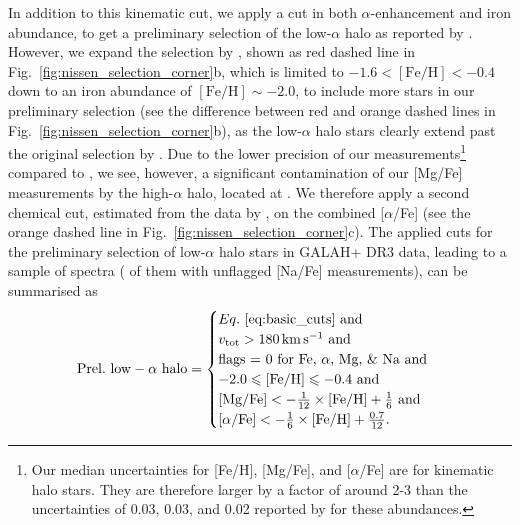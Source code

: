 \documentclass[fleqn,usenatbib]{mnras}
\begin{document}
In addition to this kinematic cut, we apply a cut in both $\alpha$-enhancement and iron abundance, to get a preliminary selection of the low-$\alpha$ halo as reported by \citet{Nissen2010}. However, we expand the selection by \citet{Nissen2010}, shown as red dashed line in Fig.~\ref{fig:nissen_selection_corner}b, which is limited to $-1.6 < \mathrm{[Fe/H]} < -0.4$ down to an iron abundance of $\mathrm{[Fe/H]} \sim -2.0$, to include more stars in our preliminary selection (see the difference between red and orange dashed lines in Fig.~\ref{fig:nissen_selection_corner}b), as the low-$\alpha$ halo stars clearly extend past the original selection by \citet{Nissen2010}. Due to the lower precision of our measurements\footnote{Our median uncertainties for [Fe/H], [Mg/Fe], and [$\alpha$/Fe] are \protect for kinematic halo stars. They are therefore larger by a factor of around 2-3 than the uncertainties of 0.03, 0.03, and 0.02 reported by \citet{Nissen2010} for these abundances.} compared to \citet{Nissen2010}, we see, however, a significant contamination of our [Mg/Fe] measurements by the high-$\alpha$ halo, located at . We therefore apply a second chemical cut, estimated from the data by \citet{Nissen2010}, on the combined [$\alpha$/Fe] (see the orange dashed line in Fig.~\ref{fig:nissen_selection_corner}c). The applied cuts for the preliminary selection of low-$\alpha$ halo stars in GALAH+ DR3 data, leading to a sample of  spectra ( of them with unflagged [Na/Fe] measurements), can be summarised as
\begin{equation} \label{eq:prelim_low_alpha_halo}
\mathrm{Prel.~low-\alpha~halo} =
\begin{cases}
Eq.~\ref{eq:basic_cuts} \text{ and} \\
v_\text{tot} > 180\,\mathrm{km\,s^{-1}} \text{ and} \\
\text{flags = 0 for Fe, }\alpha\text{, Mg, \& Na and} \\
-2.0 \leq \mathrm{[Fe/H]} \leq -0.4 \text{ and}\\
\mathrm{[Mg/Fe]} < - \frac{1}{12} \times \mathrm{[Fe/H]} + \frac{1}{6} \text{ and}\\
\mathrm{[\alpha/Fe]} < - \frac{1}{6} \times \mathrm{[Fe/H]} + \frac{0.7}{12}.\\
\end{cases}
\end{equation}
\end{document}
